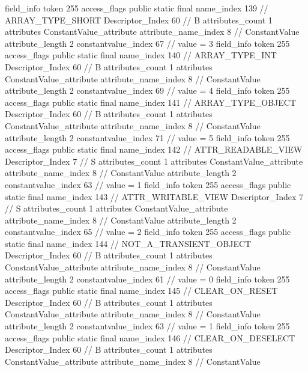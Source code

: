 {{{{{{{				}
				}
			}
			field_info {
				token	255
				access_flags	public static final
				name_index	139		// ARRAY_TYPE_SHORT
				Descriptor_Index	60		// B
				attributes_count	1
				attributes {
				ConstantValue_attribute {
					attribute_name_index	8		// ConstantValue
					attribute_length	2
					constantvalue_index	67		// value = 3
				}
				}
			}
			field_info {
				token	255
				access_flags	public static final
				name_index	140		// ARRAY_TYPE_INT
				Descriptor_Index	60		// B
				attributes_count	1
				attributes {
				ConstantValue_attribute {
					attribute_name_index	8		// ConstantValue
					attribute_length	2
					constantvalue_index	69		// value = 4
				}
				}
			}
			field_info {
				token	255
				access_flags	public static final
				name_index	141		// ARRAY_TYPE_OBJECT
				Descriptor_Index	60		// B
				attributes_count	1
				attributes {
				ConstantValue_attribute {
					attribute_name_index	8		// ConstantValue
					attribute_length	2
					constantvalue_index	71		// value = 5
				}
				}
			}
			field_info {
				token	255
				access_flags	public static final
				name_index	142		// ATTR_READABLE_VIEW
				Descriptor_Index	7		// S
				attributes_count	1
				attributes {
				ConstantValue_attribute {
					attribute_name_index	8		// ConstantValue
					attribute_length	2
					constantvalue_index	63		// value = 1
				}
				}
			}
			field_info {
				token	255
				access_flags	public static final
				name_index	143		// ATTR_WRITABLE_VIEW
				Descriptor_Index	7		// S
				attributes_count	1
				attributes {
				ConstantValue_attribute {
					attribute_name_index	8		// ConstantValue
					attribute_length	2
					constantvalue_index	65		// value = 2
				}
				}
			}
			field_info {
				token	255
				access_flags	public static final
				name_index	144		// NOT_A_TRANSIENT_OBJECT
				Descriptor_Index	60		// B
				attributes_count	1
				attributes {
				ConstantValue_attribute {
					attribute_name_index	8		// ConstantValue
					attribute_length	2
					constantvalue_index	61		// value = 0
				}
				}
			}
			field_info {
				token	255
				access_flags	public static final
				name_index	145		// CLEAR_ON_RESET
				Descriptor_Index	60		// B
				attributes_count	1
				attributes {
				ConstantValue_attribute {
					attribute_name_index	8		// ConstantValue
					attribute_length	2
					constantvalue_index	63		// value = 1
				}
				}
			}
			field_info {
				token	255
				access_flags	public static final
				name_index	146		// CLEAR_ON_DESELECT
				Descriptor_Index	60		// B
				attributes_count	1
				attributes {
				ConstantValue_attribute {
					attribute_name_index	8		// ConstantValue
}}}}}}}

